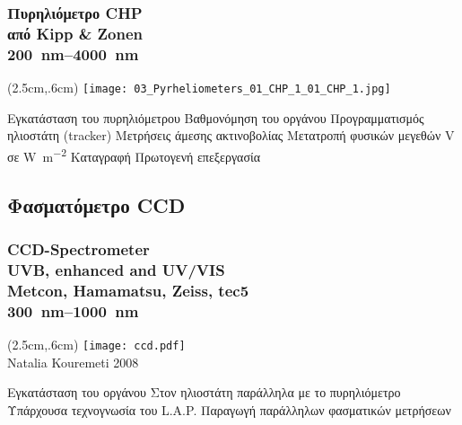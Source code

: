 \documentclass[noamsthm,12pt]{beamer}
\begin{document}
\begin{frame}
	\frametitle{Πυρηλιόμετρο CHP \\{\small από Kipp \& Zonen}\\{\small \SIrange{200}{4000}{\nano\meter}}}

	\begin{textblock*}{3cm}(2.5cm,.6cm) %
	\texttt{[image: 03\_Pyrheliometers\_01\_CHP\_1\_01\_CHP\_1.jpg]}
	\end{textblock*}

	
    \centering
	
	\begin{outline}
		\1 Εγκατάσταση του πυρηλιόμετρου
		\1 Βαθμονόμηση του οργάνου
		\1 Προγραμματισμός ηλιοστάτη (tracker)
		\1 Μετρήσεις άμεσης ακτινοβολίας
			\2[] Μετατροπή φυσικών μεγεθών \si{\volt} σε \si{\watt \per \meter^2}
			\2[] Καταγραφή
			\2[] Πρωτογενή επεξεργασία
	\end{outline}


\end{frame}

\subsection{Φασματόμετρο CCD}

\begin{frame}
	\frametitle{CCD-Spectrometer\\ \vspace{-.5\baselineskip}
	{\small UVB, enhanced and UV/VIS}\\ \vspace{-.5\baselineskip}
	{\small Metcon, Hamamatsu, Zeiss, tec5}\\
	{\small \SIrange{300}{1000}{\nano\meter}}
	}

	\begin{textblock*}{3cm}(2.5cm,.6cm) %
	\texttt{[image: ccd.pdf]}\\ \vspace{-10pt}
	{\tiny Natalia Kouremeti 2008}
	\end{textblock*}
	
	\begin{outline}
		\1 Εγκατάσταση του οργάνου
			\2[] Στον ηλιοστάτη παράλληλα με το πυρηλιόμετρο
		\1 Υπάρχουσα τεχνογνωσία του L.A.P.
		\1 Παραγωγή παράλληλων φασματικών μετρήσεων
	\end{outline}
\end{frame}
\end{document}
